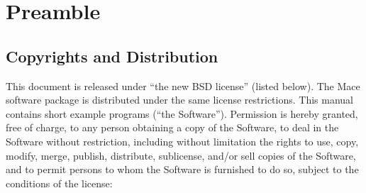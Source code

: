 % 
% 
% 
% 
% 
% 
\section{Preamble}
\label{sec:preamble}

\subsection{Copyrights and Distribution}
\label{sec:copyright}

This document is released under ``the new BSD license'' (listed below).  The
Mace software package is distributed under the same license restrictions.  This
manual contains short example programs (``the Software'').  Permission is
hereby granted, free of charge, to any person obtaining a copy of the Software,
to deal in the Software without restriction, including without limitation the
rights to use, copy, modify, merge, publish, distribute, sublicense, and/or
sell copies of the Software, and to permit persons to whom the Software is
furnished to do so, subject to the conditions of the license:

